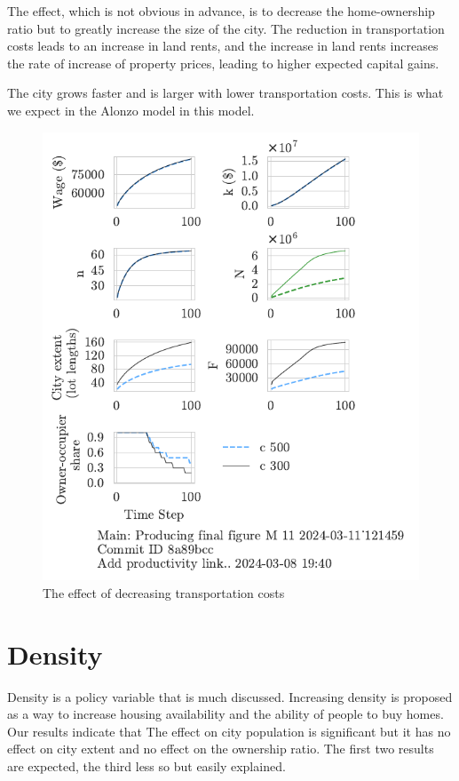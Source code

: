 The effect, which is not obvious in advance, is to decrease the home-ownership ratio but to greatly increase the size of the city. The reduction in transportation costs leads to an increase in land rents, and the increase in land rents increases the rate of increase of property prices, leading to higher expected capital gains.

The city grows faster and is larger with lower transportation costs. This is what we expect in the Alonzo model in this model.


\begin{figure}[h!t]
    \centering
    \includegraphics[scale=.8, trim={0 1.4cm 0 0},clip]{fig/c-Main-121459.pdf}
    \caption{The effect of decreasing transportation costs}
    \label{fig:c_ownership_trajectory}
\end{figure}

\section{Density}
Density is a policy variable that is much discussed. Increasing density is proposed as a way to increase housing availability and the ability of people to buy homes. Our results indicate that The effect on city population is significant but it has no effect on city extent and no effect on the ownership ratio. The first two results are expected, the third less so but easily explained. 

